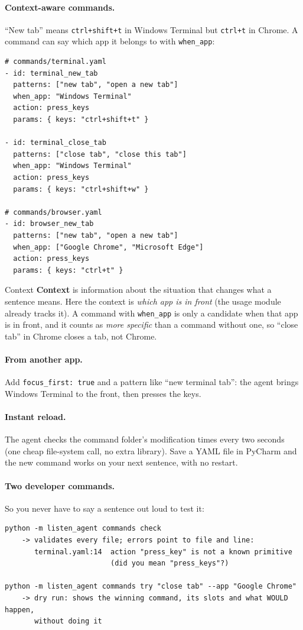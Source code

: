 \documentclass[11pt,a4paper]{article}
\begin{document}
\paragraph{Context-aware commands.} ``New tab'' means \texttt{ctrl+shift+t} in Windows Terminal
but \texttt{ctrl+t} in Chrome. A command can say which app it belongs to with
\texttt{when\_app}:
\begin{lstlisting}
# commands/terminal.yaml
- id: terminal_new_tab
  patterns: ["new tab", "open a new tab"]
  when_app: "Windows Terminal"
  action: press_keys
  params: { keys: "ctrl+shift+t" }

- id: terminal_close_tab
  patterns: ["close tab", "close this tab"]
  when_app: "Windows Terminal"
  action: press_keys
  params: { keys: "ctrl+shift+w" }

# commands/browser.yaml
- id: browser_new_tab
  patterns: ["new tab", "open a new tab"]
  when_app: ["Google Chrome", "Microsoft Edge"]
  action: press_keys
  params: { keys: "ctrl+t" }
\end{lstlisting}

\begin{concept}{Context}
\textbf{Context} is information about the situation that changes what a sentence means. Here
the context is \emph{which app is in front} (the usage module already tracks it). A command with
\texttt{when\_app} is only a candidate when that app is in front, and it counts as \emph{more
specific} than a command without one, so ``close tab'' in Chrome closes a tab, not Chrome.
\end{concept}

\paragraph{From another app.} Add \texttt{focus\_first: true} and a pattern like
``new terminal tab'': the agent brings Windows Terminal to the front, then presses the keys.

\paragraph{Instant reload.} The agent checks the command folder's modification times every
two seconds (one cheap file-system call, no extra library). Save a YAML file in PyCharm and
the new command works on your next sentence, with no restart.

\paragraph{Two developer commands.} So you never have to say a sentence out loud to test it:
\begin{lstlisting}
python -m listen_agent commands check
    -> validates every file; errors point to file and line:
       terminal.yaml:14  action "press_key" is not a known primitive
                         (did you mean "press_keys"?)

python -m listen_agent commands try "close tab" --app "Google Chrome"
    -> dry run: shows the winning command, its slots and what WOULD happen,
       without doing it
\end{lstlisting}
\end{document}

